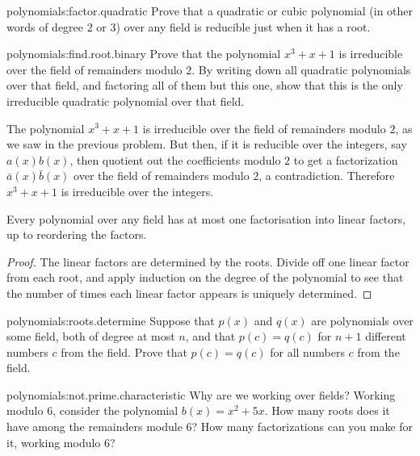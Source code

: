 \begin{problem}{polynomials:factor.quadratic}
Prove that a quadratic or cubic polynomial (in other words of degree 2 or 3) over any field is reducible just when it has a root.
\end{problem}
\begin{problem}{polynomials:find.root.binary}
Prove that the polynomial \(x^3+x+1\) is irreducible over the field of remainders modulo \(2\).
By writing down all quadratic polynomials over that field, and factoring all of them but this one, show that this is the only irreducible quadratic polynomial over that field.
\end{problem}
\begin{example}
The polynomial \(x^3+x+1\) is irreducible over the field of remainders modulo \(2\), as we saw in the previous problem.
But then, if it is reducible over the integers, say \(a(x)b(x)\), then quotient out the coefficients modulo \(2\) to get a factorization \(\bar{a}(x)\bar{b}(x)\) over the field of remainders modulo \(2\), a contradiction.
Therefore \(x^3+x+1\) is irreducible over the integers.  
\end{example}
\begin{corollary}
Every polynomial over any field has at most one factorisation into linear factors, up to reordering the factors.
\end{corollary}
\begin{proof}
The linear factors are determined by the roots.
Divide off one linear factor from each root, and apply induction on the degree of the polynomial to see that the number of times each linear factor appears is uniquely determined.
\end{proof}
\begin{problem}{polynomials:roots.determine}
Suppose that \(p(x)\) and \(q(x)\) are polynomials over some field, both of degree at most \(n\), and that \(p(c)=q(c)\) for \(n+1\) different numbers \(c\) from the field.
Prove that \(p(c)=q(c)\) for all numbers \(c\) from the field.
\end{problem}
\begin{problem}{polynomials:not.prime.characteristic}
Why are we working over fields?
Working modulo \(6\), consider the polynomial \(b(x)=x^2+5x\).
How many roots does it have among the remainders module \(6\)?
How many factorizations can you make for it, working modulo \(6\)?
\end{problem}
